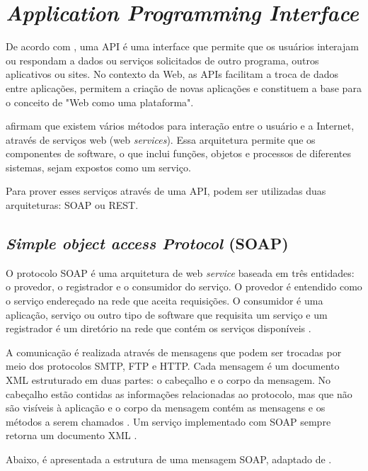 \chapter{\textit{Application Programming Interface}} \label{cap:api}

De acordo com , uma API é uma interface que permite que os 
usuários interajam ou respondam a dados ou serviços solicitados de outro programa, outros
aplicativos ou sites. No contexto da Web, as APIs facilitam a troca de dados entre 
aplicações, permitem a criação de novas aplicações e constituem a base para o conceito de 
"Web como uma plataforma". 

 afirmam que existem vários métodos para interação entre o  
usuário e a Internet, através de serviços web (web \textit{services}). Essa arquitetura permite que os componentes de software, o que inclui funções, objetos e processos de diferentes sistemas, sejam expostos 
como um serviço.

Para prover esses serviços através de uma API, podem ser utilizadas duas arquiteturas: SOAP ou REST.

\section{\textit{Simple object access Protocol} (SOAP) }

O protocolo SOAP é uma arquitetura de web \textit{service} baseada em três entidades: o provedor, o registrador e o consumidor do serviço. O provedor é entendido como o serviço endereçado na rede
que aceita requisições. O consumidor é uma aplicação, serviço ou outro tipo de software que
requisita um serviço e um registrador é um diretório na rede que contém os serviços disponíveis \cite{mumbaikar}.

A comunicação é realizada através de mensagens que podem ser trocadas por meio dos protocolos SMTP, FTP e HTTP. 
Cada mensagem é um documento XML estruturado em duas partes: o cabeçalho e o corpo da mensagem. No cabeçalho
estão contidas as informações relacionadas ao protocolo, mas que não são visíveis à aplicação e o corpo da mensagem  
contém as mensagens e os métodos a serem chamados \cite{mumbaikar, unraveling_soap, soap_and_ws}. 
Um serviço implementado com SOAP sempre retorna um documento XML \cite{wagh2012comparative}.

Abaixo, é apresentada a estrutura de uma mensagem SOAP, adaptado de . 

